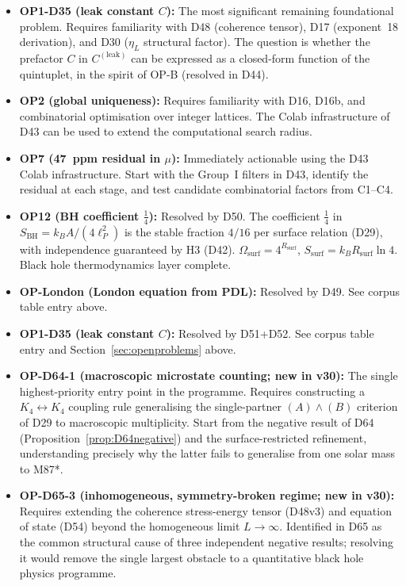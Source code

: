 \documentclass[11pt,a4paper]{article}
\theoremstyle{plain}
\theoremstyle{definition}
\theoremstyle{remark}
\newcommand{\Rsurf}{R_{\mathrm{surf}}}
\newcommand{\SBH}{S_{\mathrm{BH}}}
\begin{document}
\begin{itemize}
\item \textbf{OP1-D35 (leak constant $C$):} The most significant remaining foundational problem. Requires familiarity with D48 (coherence tensor), D17 (exponent~18 derivation), and D30 ($\eta_L$ structural factor). The question is whether the prefactor $C$ in $C^{(\mathrm{leak})}$ can be expressed as a closed-form function of the quintuplet, in the spirit of OP-B (resolved in D44).
\item \textbf{OP2 (global uniqueness):} Requires familiarity with D16, D16b, and combinatorial optimisation over integer lattices. The Colab infrastructure of D43 can be used to extend the computational search radius.
\item \textbf{OP7 (47~ppm residual in $\mu$):} Immediately actionable using the D43 Colab infrastructure. Start with the Group~I filters in D43, identify the residual at each stage, and test candidate combinatorial factors from C1--C4.
\item \textbf{OP12 (BH coefficient $\tfrac{1}{4}$):} \textcolor{proofblue}{Resolved by D50.} The coefficient $\tfrac{1}{4}$ in $\SBH = k_B A/(4\ell_P^2)$ is the stable fraction $4/16$ per surface relation (D29), with independence guaranteed by H3 (D42). $\Omega_{\mathrm{surf}} = 4^{\Rsurf}$, $S_{\mathrm{surf}} = k_B\Rsurf\ln 4$. Black hole thermodynamics layer complete.
\item \textbf{OP-London (London equation from PDL):} \textcolor{proofblue}{Resolved by D49.} See corpus table entry above.
\item \textbf{OP1-D35 (leak constant $C$):} \textcolor{proofblue}{Resolved by D51+D52.} See corpus table entry and Section~\ref{sec:openproblems} above.
\item \textbf{OP-D64-1 (macroscopic microstate counting; new in v30):} The single highest-priority entry point in the programme. Requires constructing a $K_4\leftrightarrow K_4$ coupling rule generalising the single-partner $(A)\wedge(B)$ criterion of D29 to macroscopic multiplicity. Start from the negative result of D64 (Proposition~\ref{prop:D64negative}) and the surface-restricted refinement, understanding precisely why the latter fails to generalise from one solar mass to M87*.
\item \textbf{OP-D65-3 (inhomogeneous, symmetry-broken regime; new in v30):} Requires extending the coherence stress-energy tensor (D48v3) and equation of state (D54) beyond the homogeneous limit $L\to\infty$. Identified in D65 as the common structural cause of three independent negative results; resolving it would remove the single largest obstacle to a quantitative black hole physics programme.

\end{itemize}
\end{document}
